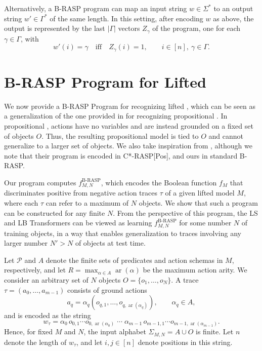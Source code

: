 Alternatively, a B-RASP program can map an input string
$w\in\Sigma^*$ to an output string $w'\in\Gamma^*$ of the same length. In
this setting, after encoding $w$ as above, the output is represented by the
last $|\Gamma|$ vectors $Z_\gamma$ of the program, one for each $\gamma\in\Gamma$, with
\[
w'(i)=\gamma
\quad\text{iff}\quad
Z_\gamma(i)=1,
\qquad i\in[n],\ \gamma\in\Gamma.
\]

\section{B-RASP Program for Lifted \strips}
\label{app:brap-program}

We now provide a B-RASP Program for recognizing lifted \strips, which can be seen as a generalization of the one provided in \citep[Appendix B]{nunez2026strips} for recognizing propositional \strips.
In propositional \strips, actions have no variables and are instead grounded on a fixed set of objects $O$. Thus, the resulting propositional \strips model is tied to $O$ and cannot generalize to a larger set of objects.
We also take inspiration from \citep[Appendix B]{sarrof2026verify}, although we note that their program is encoded in C*-RASP[Pos], and ours in standard B-RASP.

Our program computes $f^{\text{B-RASP}}_{M,N}$, which encodes the Boolean function $f_M$ that discriminates positive from negative action traces $\tau$ of a given lifted \strips model $M$, where each $\tau$ can refer to a maximum of $N$ objects. We show that such a program can be constructed for any finite $N$. From the perspective of this program, the LS and LB Transformers can be viewed as learning $f^{\text{B-RASP}}_{M,N}$ for some number $N$ of training objects, in a way that enables generalization to traces involving any larger number $N' > N$ of objects at test time.

Let $\mathcal{P}$ and $A$ denote the finite sets of predicates and action
schemas in $M$, respectively, and let
$R = \max_{\alpha\in A} \operatorname{ar}(\alpha)$
be the maximum action arity. We consider an arbitrary set of $N$ objects 
$O=\{o_1,\ldots,o_N\}$. A trace
$\tau=(a_0,\ldots,a_{m-1})$
consists of ground actions
\[
a_q
=
\alpha_q
(o_{q,1},\ldots,o_{q,\operatorname{ar}(\alpha_q)}),
\qquad
\alpha_q\in A,
\]
and is encoded as the string
\[
w_\tau
=
\alpha_0\,
o_{0,1}\cdots o_{0,\operatorname{ar}(\alpha_0)}
\;\cdots\;
\alpha_{m-1}\,
o_{m-1,1}\cdots o_{m-1,\operatorname{ar}(\alpha_{m-1})}.
\]
Hence, for fixed $M$ and $N$, the input alphabet
$\Sigma_{M,N}=A\cup O$ is finite. Let $n$ denote the length of
$w_\tau$, and let $i,j\in[n]$ denote positions in this string.

